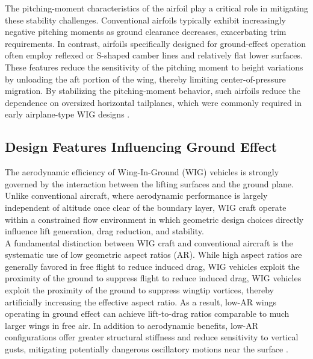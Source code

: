 \noindent The pitching-moment characteristics of the airfoil play a critical role in mitigating these stability challenges. Conventional airfoils typically exhibit increasingly negative pitching moments as ground clearance decreases, exacerbating trim requirements. In contrast, airfoils specifically designed for ground-effect operation often employ reflexed or S-shaped camber lines and relatively flat lower surfaces. These features reduce the sensitivity of the pitching moment to height variations by unloading the aft portion of the wing, thereby limiting center-of-pressure migration. By stabilizing the pitching-moment behavior, such airfoils reduce the dependence on oversized horizontal tailplanes, which were commonly required in early airplane-type WIG designs \cite{Conference_paper_DHMTU}\cite{DSTO}.

\subsection{Design Features Influencing Ground Effect}

The aerodynamic efficiency of Wing-In-Ground (WIG) vehicles is strongly governed by the
interaction between the lifting surfaces and the ground plane. Unlike conventional aircraft,
where aerodynamic performance is largely independent of altitude once clear of the boundary
layer, WIG craft operate within a constrained flow environment in which geometric design
choices directly influence lift generation, drag reduction, and stability.\\

\noindent A fundamental distinction between WIG craft and conventional aircraft is the systematic use
of low geometric aspect ratios (AR). While high aspect ratios are generally favored in free flight to reduce induced drag, WIG vehicles exploit the proximity of the ground to suppress
flight to reduce induced drag, WIG vehicles exploit the proximity of the ground to suppress
wingtip vortices, thereby artificially increasing the effective aspect ratio. As a result,
low-AR wings operating in ground effect can achieve lift-to-drag ratios comparable to much
larger wings in free air. In addition to aerodynamic benefits, low-AR configurations offer
greater structural stiffness and reduce sensitivity to vertical gusts, mitigating potentially
dangerous oscillatory motions near the surface \cite{IFAC_controlled_WIG_flight_concept}\cite{HINDAWI_unsteady_effects}.\\

